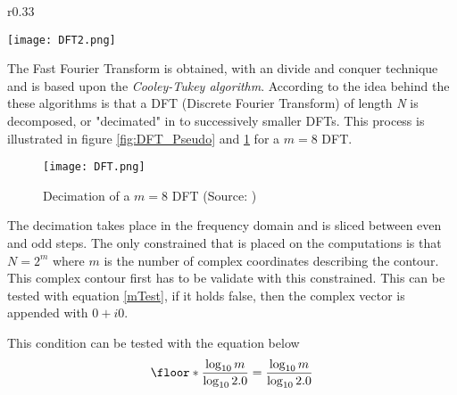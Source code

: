 \documentclass[11pt,fleqn,,a4paper,twoside,openright]{book}
\begin{document}
\begin{wrapfigure}{r}{0.33\textwidth}
	\begin{center}
		\texttt{[image: DFT2.png]}
	\end{center}
	\caption{Butterfly network that represent the fundamental computation (Source: \citeauthor{canale2014numerical})}
	\label{fig:DFT_Pseudo}
\end{wrapfigure}
The Fast Fourier Transform is obtained, with an divide and conquer technique and is based upon the \textit{Cooley-Tukey algorithm}. According to \citeauthor{canale2014numerical} \cite{canale2014numerical} the idea behind the these algorithms is that a DFT (Discrete Fourier Transform) of length \textit{N} is decomposed, or "decimated" in to successively smaller DFTs. This process is illustrated in figure \ref{fig:DFT_Pseudo} and \ref{fig:DecimationDFT} for a $ m = 8 $ DFT.
\begin{figure}[h]
	\centering
	\begin{sBox}
		\texttt{[image: DFT.png]}	
	\end{sBox}
	\caption{Decimation of a $ m = 8 $ DFT (Source: \citeauthor{canale2014numerical})}
	\label{fig:DecimationDFT}
\end{figure}
The decimation takes place in the frequency domain and is sliced between even and odd steps. The only constrained that is placed on the computations is that $ N = 2^m $ where $ m $ is the number of complex coordinates describing the contour. This complex contour first has to be validate with this constrained. This can be tested with equation \ref{mTest}, if  it holds false, then the complex vector is appended with $ 0 + i 0 $.
\begin{sBox}
	This condition can be tested with the equation below 
	\begin{equation}\label{mTest}
		\floor*{\frac{\log_{10} m}{\log_{10} 2.0}} = \frac{\log_{10} m}{\log_{10} 2.0}
	\end{equation}
\end{sBox} 
\end{document}
